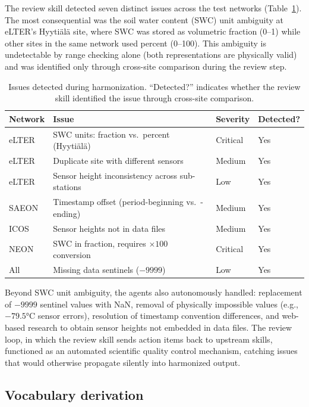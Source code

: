 \documentclass[review,authoryear]{elsarticle}
\begin{document}
The review skill detected seven distinct issues across the test networks (Table~\ref{tab:issues}). The most consequential was the soil water content (SWC) unit ambiguity at eLTER's Hyyti\"{a}l\"{a} site, where SWC was stored as volumetric fraction (0--1) while other sites in the same network used percent (0--100). This ambiguity is undetectable by range checking alone (both representations are physically valid) and was identified only through cross-site comparison during the review step.

\begin{table}[htbp]
\centering
\caption{Issues detected during harmonization. ``Detected?'' indicates whether the review skill identified the issue through cross-site comparison.}
\label{tab:issues}
\small
\begin{tabular}{llll}
\toprule
Network & Issue & Severity & Detected? \\
\midrule
eLTER & SWC units: fraction vs.\ percent (Hyyti\"{a}l\"{a}) & Critical & Yes \\
eLTER & Duplicate site with different sensors & Medium & Yes \\
eLTER & Sensor height inconsistency across sub-stations & Low & Yes \\
SAEON & Timestamp offset (period-beginning vs.\ -ending) & Medium & Yes \\
ICOS & Sensor heights not in data files & Medium & Yes \\
NEON & SWC in fraction, requires $\times 100$ conversion & Critical & Yes \\
All & Missing data sentinels ($-9999$) & Low & Yes \\
\bottomrule
\end{tabular}
\end{table}

Beyond SWC unit ambiguity, the agents also autonomously handled: replacement of $-9999$ sentinel values with NaN, removal of physically impossible values (e.g., $-79.5$\si{\degreeCelsius} sensor errors), resolution of timestamp convention differences, and web-based research to obtain sensor heights not embedded in data files. The review loop, in which the review skill sends action items back to upstream skills, functioned as an automated scientific quality control mechanism, catching issues that would otherwise propagate silently into harmonized output.

\subsection{Vocabulary derivation}
\label{sec:vocab-results}
\end{document}
